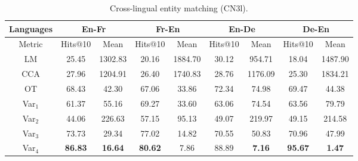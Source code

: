 \documentclass{article}
\begin{document}
\begin{table*}[t!]
\centering
\begin{minipage}[t]{0.63\linewidth}
\captionsetup{justification=centering}
\caption{Cross-lingual entity matching (CN3l).}
\label{table:CN3l_entity_matching}
\scriptsize			
\begin{tabular}{c|cc|cc|cc|cc}
\bhline
Languages&\multicolumn{2}{c|}{En-Fr} & \multicolumn{2}{c|}{Fr-En} & \multicolumn{2}{c|}{En-De} & \multicolumn{2}{c}{De-En} \\
\hline
Metric&\multicolumn{1}{c}{Hits@10}&\multicolumn{1}{c|}{Mean}&\multicolumn{1}{c}{Hits@10}&\multicolumn{1}{c|}{Mean}&\multicolumn{1}{c}{Hits@10}&\multicolumn{1}{c|}{Mean}&\multicolumn{1}{c}{Hits@10}&\multicolumn{1}{c}{Mean}\\ \bhline
LM&\multicolumn{1}{c}{25.45}&\multicolumn{1}{c|}{1302.83}&\multicolumn{1}{c}{20.16}&\multicolumn{1}{c|}{1884.70}&\multicolumn{1}{c}{30.12}&\multicolumn{1}{c|}{954.71}&\multicolumn{1}{c}{18.04}&\multicolumn{1}{c}{1487.90}\\
CCA&\multicolumn{1}{c}{27.96}&\multicolumn{1}{c|}{1204.91}&\multicolumn{1}{c}{26.40}&\multicolumn{1}{c|}{1740.83}&\multicolumn{1}{c}{28.76}&\multicolumn{1}{c|}{1176.09}&\multicolumn{1}{c}{25.30}&\multicolumn{1}{c}{1834.21}\\
OT&\multicolumn{1}{c}{68.43}&\multicolumn{1}{c|}{42.30}&\multicolumn{1}{c}{67.06}&\multicolumn{1}{c|}{33.86}&\multicolumn{1}{c}{72.34}&\multicolumn{1}{c|}{74.98}&\multicolumn{1}{c}{69.47}&\multicolumn{1}{c}{44.38}\\
\hline
Var${_1}$&\multicolumn{1}{c}{61.37}&\multicolumn{1}{c|}{55.16}&\multicolumn{1}{c}{69.27}&\multicolumn{1}{c|}{33.60}&\multicolumn{1}{c}{63.06}&\multicolumn{1}{c|}{74.54}&\multicolumn{1}{c}{63.56}&\multicolumn{1}{c}{79.79}\\
Var${_2}$&\multicolumn{1}{c}{44.06}&\multicolumn{1}{c|}{226.63}&\multicolumn{1}{c}{57.15}&\multicolumn{1}{c|}{95.13}&\multicolumn{1}{c}{49.07}&\multicolumn{1}{c|}{219.97}&\multicolumn{1}{c}{49.15}&\multicolumn{1}{c}{214.58}\\
Var${_3}$&\multicolumn{1}{c}{73.73}&\multicolumn{1}{c|}{29.34}&\multicolumn{1}{c}{77.02}&\multicolumn{1}{c|}{14.82}&\multicolumn{1}{c}{70.55}&\multicolumn{1}{c|}{50.83}&\multicolumn{1}{c}{70.96}&\multicolumn{1}{c}{47.99}\\
Var${_4}$&\multicolumn{1}{c}{\textbf{86.83}}&\multicolumn{1}{c|}{\textbf{16.64}}&\multicolumn{1}{c}{\textbf{80.62}}&\multicolumn{1}{c|}{7.86}&\multicolumn{1}{c}{88.89}&\multicolumn{1}{c|}{\textbf{7.16}}&\multicolumn{1}{c}{\textbf{95.67}}&\multicolumn{1}{c}{\textbf{1.47}}\\

\end{tabular}
\end{minipage}
\end{table*}
\end{document}
